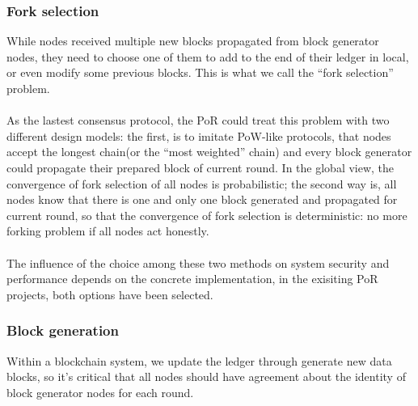 \documentclass[doublespacing]{bmcart}
\begin{document}
\begin{CJK*}{UTF8}{gbsn}
\subsubsection*{Fork selection}
While nodes received multiple new blocks propagated from block generator nodes, they need to choose one of them to add to the end of their ledger in local, or even modify some previous blocks. This is what we call the ``fork selection'' problem. 
\paragraph{} As the lastest consensus protocol, the PoR could treat this problem with two different design models: the first, is to imitate PoW-like protocols, that nodes accept the longest chain(or the ``most weighted'' chain) and every block generator could propagate their prepared block of current round. In the global view, the convergence of fork selection of all nodes is probabilistic; the second way is, all nodes know that there is one and only one block generated and propagated for current round, so that the convergence of fork selection is deterministic: no more forking problem if all nodes act honestly.
\paragraph{} The influence of the choice among these two methods on system security and performance depends on the concrete implementation, in the exisiting PoR projects, both options have been selected.
\subsubsection*{Block generation}
Within a blockchain system, we update the ledger through generate new data blocks, so it's critical that all nodes should have agreement about the identity of  block generator nodes for each round.

\end{CJK*}
\end{document}
